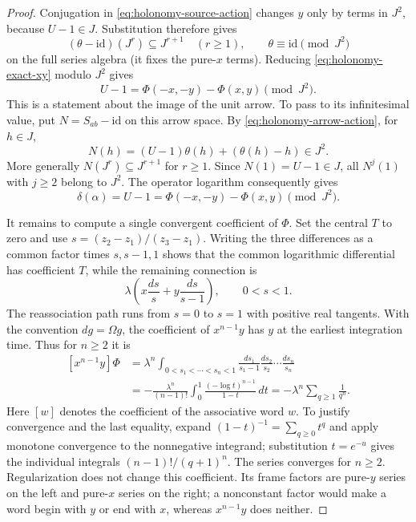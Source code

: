 \documentclass[11pt]{article}
\newcommand{\id}{\mathrm{id}}
\theoremstyle{definition}
\theoremstyle{remark}
\numberwithin{equation}{section}
\begin{document}
\begin{proof}
Conjugation in \eqref{eq:holonomy-source-action} changes $y$ only by
terms in $J^2$, because $U-1\in J$.  Substitution therefore gives
\[
 (\theta-\id)(J^r)\subseteq J^{r+1}\quad(r\geq1),
 \qquad\theta\equiv\id\pmod{J^2}
\]
on the full series algebra (it fixes the pure-$x$ terms).
Reducing \eqref{eq:holonomy-exact-xy} modulo $J^2$ gives
\begin{equation}\label{eq:holonomy-unit-difference}
 U-1=\Phi(-x,-y)-\Phi(x,y)\pmod{J^2}.
\end{equation}
This is a statement about the image of the unit arrow.  To pass to its
infinitesimal value, put $N=S_{ab}-\id$ on this arrow space.  By
\eqref{eq:holonomy-arrow-action}, for $h\in J$,
\[
 N(h)=(U-1)\theta(h)+(\theta(h)-h)\in J^2.
\]
More generally $N(J^r)\subseteq J^{r+1}$ for $r\geq1$.
Since $N(1)=U-1\in J$, all $N^j(1)$ with $j\geq2$ belong to $J^2$.
The operator logarithm consequently gives
\begin{equation}\label{eq:holonomy-log-depth-one}
 \delta(\alpha)=U-1
 =\Phi(-x,-y)-\Phi(x,y)\pmod{J^2}.
\end{equation}

It remains to compute a single convergent coefficient of $\Phi$.
Set the central $T$ to zero and use
$s=(z_2-z_1)/(z_3-z_1)$.  Writing the three differences as a common
factor times $s,s-1,1$ shows that the common logarithmic differential
has coefficient $T$, while the remaining connection is
\begin{equation}\label{eq:holonomy-interval-connection}
 \lambda\left(x\frac{ds}{s}+y\frac{ds}{s-1}\right),
 \qquad 0<s<1.
\end{equation}
The reassociation path runs from $s=0$ to $s=1$ with positive real
tangents.  With the convention $dg=\Omega g$, the coefficient of
$x^{n-1}y$ has $y$ at the earliest integration time.  Thus for $n\geq2$
it is
\begin{equation}\label{eq:holonomy-zeta-integral}
\begin{split}
 [x^{n-1}y]\Phi
 &=\lambda^n
 \int_{0<s_1<\cdots<s_n<1}
 \frac{ds_1}{s_1-1}\frac{ds_2}{s_2}\cdots\frac{ds_n}{s_n}\\
 &=-\frac{\lambda^n}{(n-1)!}
 \int_0^1\frac{(-\log t)^{n-1}}{1-t}\,dt
 =-\lambda^n\sum_{q\geq1}\frac1{q^n}.
\end{split}
\end{equation}
Here $[w]$ denotes the coefficient of the associative word $w$.
To justify convergence and the last equality, expand
$(1-t)^{-1}=\sum_{q\geq0}t^q$ and apply monotone convergence to the
nonnegative integrand; substitution $t=e^{-u}$ gives the individual
integrals $(n-1)!/(q+1)^n$.  The series converges for $n\geq2$.
Regularization does not change this coefficient.  Its frame factors
are pure-$y$ series on the left and pure-$x$ series on the right; a
nonconstant factor would make a word begin with $y$ or end with $x$,
whereas $x^{n-1}y$ does neither.


\end{proof}
\end{document}
